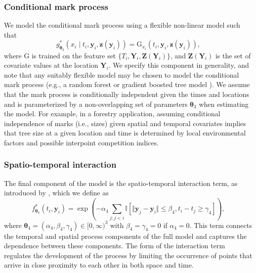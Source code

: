 \subsubsection{Conditional mark process}\label{conditional-mark-process}

We model the conditional mark process using a flexible non-linear model
such that \[
g_{\boldsymbol{\theta}_3}^*(x_i \mid t_i, \boldsymbol{y}_i, \boldsymbol{z}(\boldsymbol{y}_i)) = \text{G}_{x_i}(t_i, \boldsymbol{y}_i, \boldsymbol{z}(\boldsymbol{y}_i)),
\] where \(\text{G}\) is trained on the feature set
\(\{T_i, \boldsymbol{Y}_i, \boldsymbol{Z}(\boldsymbol{Y}_i)\}\), and
\(\boldsymbol{Z}(\boldsymbol{Y}_i)\) is the set of covariate values at the
location \(\boldsymbol{Y}_i\). We specify this component in generality,
and note that any suitably flexible model may be chosen to model the
conditional mark process (e.g., a random forest
\citep{breimanRandomForests2001} or gradient boosted tree model
\citep{chenXGBoostScalableTree2016}). We assume that the mark process is
conditionally independent given the times and locations and is
parameterized by a non-overlapping set of parameters
\(\boldsymbol{\theta}_3\) when estimating the model. For example, in a
forestry application, assuming conditional independence of marks (i.e.,
sizes) given spatial and temporal covariates implies that tree size at a
given location and time is determined by local environmental factors and
possible interpoint competition indices.

\subsubsection{Spatio-temporal interaction}\label{spatio-temporal-interaction}

The final component of the model is the spatio-temporal interaction
term, as introduced by \citet{mollerMechanisticSpatiotemporalPoint2016a}, which
we define as \[
f_{\boldsymbol{\theta}_4}^*(t_i, \boldsymbol{y}_i) = \exp \left ( -\alpha_4 \sum_{j: j < i} \mathbb{I}[ \Vert \boldsymbol{y}_j - \boldsymbol{y}_i \Vert \leq \beta_4, t_i - t_j \geq \gamma_4] \right ),
\] where
\(\boldsymbol{\theta}_4 = (\alpha_4, \beta_4, \gamma_4) \in [0, \infty)^3\)
with \(\beta_4 = \gamma_4 = 0\) if \(\alpha_4 = 0\). This term connects the
temporal and spatial process components of the full model and captures
the dependence between these components. The form of the interaction
term regulates the development of the process by limiting the occurrence
of points that arrive in close proximity to each other in both space and
time.

